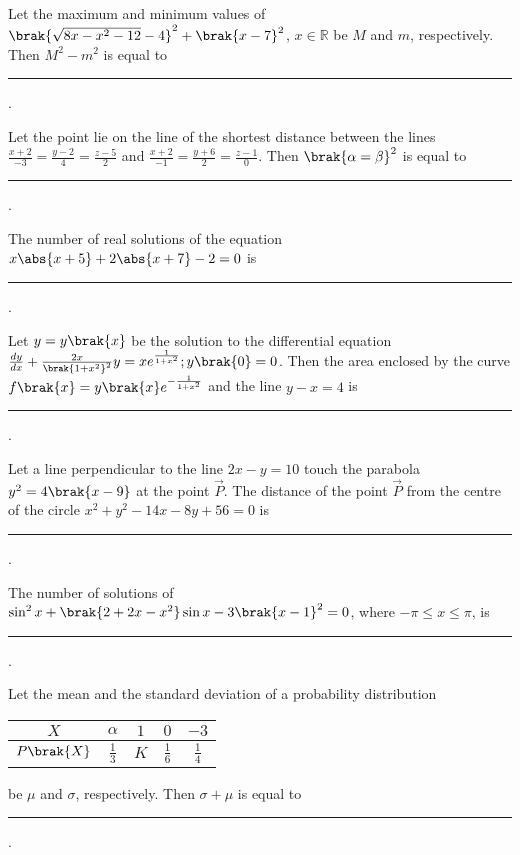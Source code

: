 \iffalse
\title{2024}
\author{EE24Btech11024 - G. Abhimanyu Koushik}
\section{integer}
\fi

\item Let the maximum and minimum values of $\brak{\sqrt{8x-x^2-12}-4}^2+\brak{x-7}^2$, $x\in\mathbb{R}$ be $M$ and $m$, respectively. Then $M^2-m^2$ is equal to \rule{1cm}{0.15mm}.

\hfill{}

\item Let the point  lie on the line of the shortest distance between the lines $\frac{x+2}{-3}=\frac{y-2}{4}=\frac{z-5}{2}$ and $\frac{x+2}{-1}=\frac{y+6}{2}=\frac{z-1}{0}$. Then $\brak{\alpha=\beta}^2$ is equal to \rule{1cm}{0.15mm}.

\hfill{}

\item The number of real solutions of the equation $x\abs{x+5}+2\abs{x+7}-2=0$ is \rule{1cm}{0.15mm}.

\hfill{}

\item Let $y=y\brak{x}$ be the solution to the differential equation $\frac{dy}{dx}+\frac{2x}{\brak{1+x^2}^2}y=xe^{\frac{1}{1+x^2}};y\brak{0}=0$. Then the area enclosed by the curve $f\brak{x}=y\brak{x}e^{-\frac{1}{1+x^2}}$ and the line $y-x=4$ is \rule{1cm}{0.15mm}.

\hfill{}

\item Let a line perpendicular to the line $2x-y=10$ touch the parabola $y^2=4\brak{x-9}$ at the point $\vec{P}$. The distance of the point $\vec{P}$ from the centre of the circle $x^2+y^2-14x-8y+56=0$ is \rule{1cm}{0.15mm}.

\hfill{}

\item The number of solutions of $\sin^{2}x+\brak{2+2x-x^2}\sin x - 3\brak{x-1}^2=0$, where $-\pi\leq x\leq \pi$, is \rule{1cm}{0.15mm}.

\hfill{}

\item Let the mean and the standard deviation of a probability distribution\\
\begin{center}
   \begin{tabular}[12pt]{ |c|c|c|c|c|}
    \hline
    $X$ & $\alpha$ & $1$ & $0$ & $-3$\\
    \hline
    $P\brak{X}$ & $\frac{1}{3}$ & $K$ & $\frac{1}{6}$ & $\frac{1}{4}$\\
    \hline
    \end{tabular}
\end{center}
be $\mu$ and $\sigma$, respectively. Then $\sigma+\mu$ is equal to \rule{1cm}{0.15mm}.

